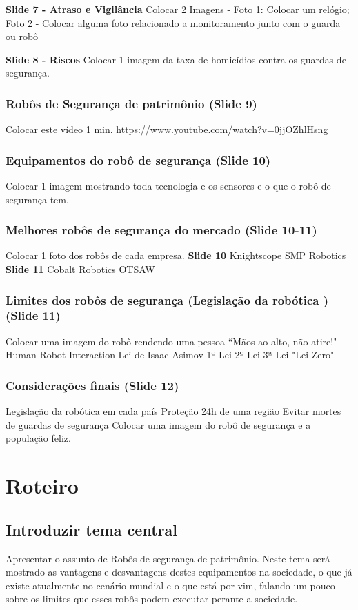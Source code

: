 \documentclass[12pt,a4paper]{article}
\begin{document}
    \textbf{Slide 7 - Atraso e Vigilância}
    Colocar 2 Imagens - Foto 1: Colocar um relógio; Foto 2 - Colocar alguma foto relacionado a monitoramento junto com o guarda ou robô

    \textbf{Slide 8 - Riscos}
    Colocar 1 imagem da taxa de homicídios contra os guardas de segurança.

    \subsubsection{Robôs de Segurança de patrimônio (Slide 9)}
    Colocar este vídeo 1 min. https://www.youtube.com/watch?v=0jjOZhlHsng

    \subsubsection{Equipamentos do robô de segurança (Slide 10)}
    Colocar 1 imagem mostrando toda tecnologia e os sensores e o que o robô de segurança tem.

    \subsubsection{Melhores robôs de segurança do mercado (Slide 10-11)}
    Colocar 1 foto dos robôs de cada empresa.
    \textbf{Slide 10}
    Knightscope
    SMP Robotics
    \textbf{Slide 11}
    Cobalt Robotics
    OTSAW

    \subsubsection{Limites dos robôs de segurança (Legislação da robótica
    ) (Slide 11)}
    Colocar uma imagem do robô rendendo uma pessoa
    “Mãos ao alto, não atire!" 
    Human-Robot Interaction
    Lei de Isaac Asimov
        1º Lei
        2º Lei
        3ª Lei
        "Lei Zero"

    \subsubsection{Considerações finais (Slide 12)}
    Legislação da robótica em cada país
    Proteção 24h de uma região
    Evitar mortes de guardas de segurança
    Colocar uma imagem do robô de segurança e a população feliz.

    \section{Roteiro}
    \subsection{Introduzir tema central}
    Apresentar o assunto de Robôs de segurança de patrimônio. Neste tema será mostrado as vantagens e desvantagens destes equipamentos na sociedade, o que já existe atualmente no cenário mundial e o que está por vim, falando um pouco sobre os limites que esses robôs podem executar perante a sociedade.
\end{document}
